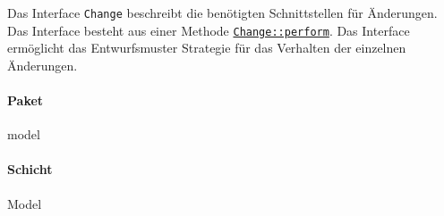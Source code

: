 Das Interface \verb#Change# beschreibt die benötigten Schnittstellen für Änderungen.
Das Interface besteht aus einer Methode \hyperref[AP_Change_perform]{\texttt{Change::perform}}.
Das Interface ermöglicht das Entwurfsmuster Strategie für das Verhalten der einzelnen Änderungen.

\paragraph*{Paket}
model

\paragraph*{Schicht}
Model